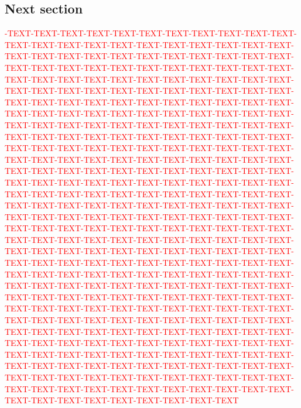 \documentclass[a0,portrait]{a0poster}
\begin{document}
\begin{multicols}{3}
\section{Next section}

\textcolor{red}{-TEXT-TEXT-TEXT-TEXT-TEXT-TEXT-TEXT-TEXT-TEXT-TEXT-TEXT-TEXT-TEXT-TEXT-TEXT-TEXT-TEXT-TEXT-TEXT-TEXT-TEXT-TEXT-TEXT-TEXT-TEXT-TEXT-TEXT-TEXT-TEXT-TEXT-TEXT-TEXT-TEXT-TEXT-TEXT-TEXT-TEXT-TEXT-TEXT-TEXT-TEXT-TEXT-TEXT-TEXT-TEXT-TEXT-TEXT-TEXT-TEXT-TEXT-TEXT-TEXT-TEXT-TEXT-TEXT-TEXT-TEXT-TEXT-TEXT-TEXT-TEXT-TEXT-TEXT-TEXT-TEXT-TEXT-TEXT-TEXT-TEXT-TEXT-TEXT-TEXT-TEXT-TEXT-TEXT-TEXT-TEXT-TEXT-TEXT-TEXT-TEXT-TEXT-TEXT-TEXT-TEXT-TEXT-TEXT-TEXT-TEXT-TEXT-TEXT-TEXT-TEXT-TEXT-TEXT-TEXT-TEXT-TEXT-TEXT-TEXT-TEXT-TEXT-TEXT-TEXT-TEXT-TEXT-TEXT-TEXT-TEXT-TEXT-TEXT-TEXT-TEXT-TEXT-TEXT-TEXT-TEXT-TEXT-TEXT-TEXT-TEXT-TEXT-TEXT-TEXT-TEXT-TEXT-TEXT-TEXT-TEXT-TEXT-TEXT-TEXT-TEXT-TEXT-TEXT-TEXT-TEXT-TEXT-TEXT-TEXT-TEXT-TEXT-TEXT-TEXT-TEXT-TEXT-TEXT-TEXT-TEXT-TEXT-TEXT-TEXT-TEXT-TEXT-TEXT-TEXT-TEXT-TEXT-TEXT-TEXT-TEXT-TEXT-TEXT-TEXT-TEXT-TEXT-TEXT-TEXT-TEXT-TEXT-TEXT-TEXT-TEXT-TEXT-TEXT-TEXT-TEXT-TEXT-TEXT-TEXT-TEXT-TEXT-TEXT-TEXT-TEXT-TEXT-TEXT-TEXT-TEXT-TEXT-TEXT-TEXT-TEXT-TEXT-TEXT-TEXT-TEXT-TEXT-TEXT-TEXT-TEXT-TEXT-TEXT-TEXT-TEXT-TEXT-TEXT-TEXT-TEXT-TEXT-TEXT-TEXT-TEXT-TEXT-TEXT-TEXT-TEXT-TEXT-TEXT-TEXT-TEXT-TEXT-TEXT-TEXT-TEXT-TEXT-TEXT-TEXT-TEXT-TEXT-TEXT-TEXT-TEXT-TEXT-TEXT-TEXT-TEXT-TEXT-TEXT-TEXT-TEXT-TEXT-TEXT-TEXT-TEXT-TEXT-TEXT-TEXT-TEXT-TEXT-TEXT-TEXT-TEXT-TEXT-TEXT-TEXT-TEXT-TEXT-TEXT-TEXT-TEXT-TEXT-TEXT-TEXT-TEXT-TEXT-TEXT-TEXT-TEXT-TEXT-TEXT-TEXT-TEXT-TEXT-TEXT-TEXT-TEXT-TEXT-TEXT-TEXT-TEXT-TEXT-TEXT-TEXT-TEXT-TEXT-TEXT-TEXT-TEXT-TEXT-TEXT-TEXT-TEXT-TEXT-TEXT-TEXT-TEXT-TEXT-TEXT-TEXT-TEXT-TEXT-TEXT-TEXT-TEXT-TEXT-TEXT-TEXT-TEXT-TEXT-TEXT-TEXT-TEXT-TEXT-TEXT-TEXT-TEXT-TEXT-TEXT-TEXT-TEXT-TEXT-TEXT-TEXT-TEXT-TEXT-TEXT-TEXT-TEXT-TEXT-TEXT-TEXT-TEXT-TEXT-TEXT-TEXT-TEXT-TEXT-TEXT-TEXT-TEXT-TEXT-TEXT-TEXT-TEXT-TEXT-TEXT-TEXT-TEXT-TEXT-TEXT-TEXT-TEXT-TEXT-TEXT-TEXT-TEXT-TEXT-TEXT-TEXT-TEXT} 

\vspace{2cm}
\begin{tcolorbox}[width=0.95\linewidth,colback={conclusion},frame empty,boxsep=1cm]

\end{tcolorbox}
\end{multicols}
\end{document}
